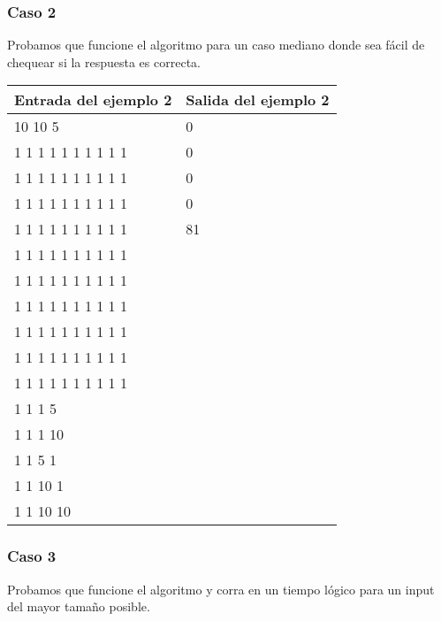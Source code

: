 \subsubsection*{Caso 2}

Probamos que funcione el algoritmo para un caso mediano donde sea fácil de chequear si la respuesta es correcta.

\begin{center}
    \begin{tabular}{| l | l |}
    \hline
    Entrada del ejemplo 2 & Salida del ejemplo 2  \\ \hline
	10 10 5 & 0 \\
	1 1 1 1 1 1 1 1 1 1 & 0 \\
	1 1 1 1 1 1 1 1 1 1 & 0 \\
	1 1 1 1 1 1 1 1 1 1 & 0 \\
	1 1 1 1 1 1 1 1 1 1 & 81 \\
	1 1 1 1 1 1 1 1 1 1 & \\
	1 1 1 1 1 1 1 1 1 1 & \\
	1 1 1 1 1 1 1 1 1 1 & \\
	1 1 1 1 1 1 1 1 1 1 & \\
	1 1 1 1 1 1 1 1 1 1 & \\
	1 1 1 1 1 1 1 1 1 1 & \\
	1 1 1 5 & \\
	1 1 1 10 & \\
	1 1 5 1 & \\
	1 1 10 1 & \\
	1 1 10 10 & \\
	\hline
    \end{tabular}
\end{center}

\subsubsection*{Caso 3}

Probamos que funcione el algoritmo y corra en un tiempo lógico para un input del mayor tamaño posible.

